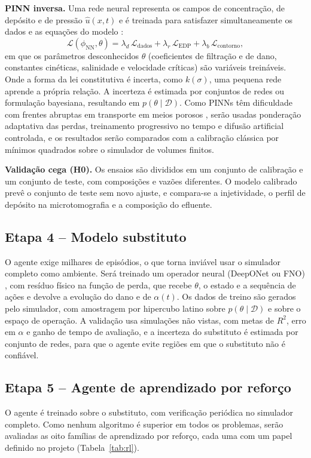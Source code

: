 \documentclass[11pt,a4paper]{article}
\begin{document}
\textbf{PINN inversa.} Uma rede neural representa os campos de concentração, de depósito e
de pressão $\hat{u}(x,t)$ e é treinada para satisfazer simultaneamente os dados e as
equações do modelo \cite{raissi2019}:
\begin{equation}
\mathcal{L}(\phi_{\mathrm{NN}},\theta) =
\lambda_d\,\mathcal{L}_{\mathrm{dados}} + \lambda_r\,\mathcal{L}_{\mathrm{EDP}} + \lambda_b\,\mathcal{L}_{\mathrm{contorno}},
\end{equation}
em que os parâmetros desconhecidos $\theta$ (coeficientes de filtração e de dano,
constantes cinéticas, salinidade e velocidade críticas) são variáveis treináveis. Onde a
forma da lei constitutiva é incerta, como $k(\sigma)$, uma pequena rede aprende a própria
relação. A incerteza é estimada por conjuntos de redes ou formulação bayesiana, resultando
em $p(\theta\mid\mathcal{D})$. Como PINNs têm dificuldade com frentes abruptas em
transporte em meios porosos \cite{fuks2020}, serão usadas ponderação adaptativa das
perdas, treinamento progressivo no tempo e difusão artificial controlada, e os resultados
serão comparados com a calibração clássica por mínimos quadrados sobre o simulador de
volumes finitos.

\textbf{Validação cega (H0).} Os ensaios são divididos em um conjunto de calibração e um
conjunto de teste, com composições e vazões diferentes. O modelo calibrado prevê o
conjunto de teste sem novo ajuste, e compara-se a injetividade, o perfil de depósito na
microtomografia e a composição do efluente.

\subsection{Etapa 4 -- Modelo substituto}
O agente exige milhares de episódios, o que torna inviável usar o simulador completo como
ambiente. Será treinado um operador neural (DeepONet ou FNO) \cite{lu2021deeponet,li2021fno},
com resíduo físico na função de perda, que recebe $\theta$, o estado e a sequência de
ações e devolve a evolução do dano e de $\alpha(t)$. Os dados de treino são gerados pelo
simulador, com amostragem por hipercubo latino sobre $p(\theta\mid\mathcal{D})$ e sobre o
espaço de operação. A validação usa simulações não vistas, com metas de $R^2$, erro em
$\alpha$ e ganho de tempo de avaliação, e a incerteza do substituto é estimada por
conjunto de redes, para que o agente evite regiões em que o substituto não é confiável.

\subsection{Etapa 5 -- Agente de aprendizado por reforço}
O agente é treinado sobre o substituto, com verificação periódica no simulador completo.
Como nenhum algoritmo é superior em todos os problemas, serão avaliadas as oito famílias de
aprendizado por reforço, cada uma com um papel definido no projeto
(Tabela~\ref{tab:rl}).
\end{document}
